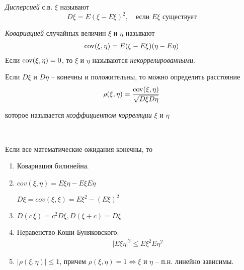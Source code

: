 
\begin{definition}
  \emph{Дисперсией} с.в. $\xi$ называют
  \begin{equation*}
    D\xi = E(\xi - E\xi)^2, \quad \text{если $E\xi$ существует}
  \end{equation*}
\end{definition}

\begin{definition}
  \emph{Ковариацией} случайных величин $\xi$ и $\eta$ называют
  \begin{align*}
    \operatorname{cov}(\xi, \eta) = E(\xi - E\xi) (\eta - E\eta)
  \end{align*}
  Если $\operatorname{cov}(\xi, \eta) = 0$, то $\xi$ и $\eta$ называются \emph{некоррелированными}.
\end{definition}

Если $D\xi$ и $D\eta$ -- конечны и положительны, то можно определить расстояние
\begin{align*}
  \rho(\xi, \eta) = \frac{\operatorname{cov}(\xi, \eta)}{\sqrt{D \xi D \eta}}
\end{align*}

которое называется \emph{коэффициентом корреляции} $\xi$ и $\eta$

\begin{lemma}~

  Если все математические ожидания конечны, то 
  \begin{enumerate}
    \item 
      Ковариация билинейна.

    \item 
      $cov(\xi, \eta) = E \xi \eta - E\xi E\eta$

      $D\xi = cov(\xi, \xi) = E\xi^2 - (E \xi)^2$

    \item 
      $D(c\, \xi) = c^2 D \xi, D(\xi + c) = D \xi$

    \item 
      Неравенство Коши-Буняковского.
      \begin{align*}
        |E\xi \eta|^2 \leq E\xi^2 E\eta^2
      \end{align*}

    \item 
      $|\rho(\xi, \eta)| \leq 1$, 
      причем $\rho(\xi, \eta) = 1 \Leftrightarrow \xi$ и $\eta$ -- п.н. линейно зависимы.
  \end{enumerate}

\end{lemma}

